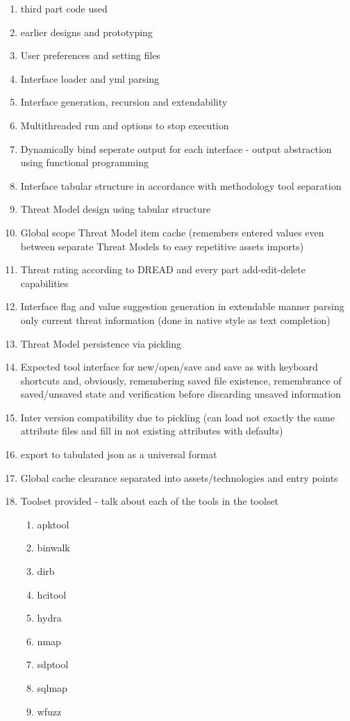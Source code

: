 \begin{enumerate}
\begin{enumerate}
		\item third part code used
		
		\item earlier designs and prototyping
		
		\item User preferences and setting files
		\item Interface loader and yml parsing
		\item Interface generation, recursion and extendability
		\item Multithreaded run and options to stop execution
		\item Dynamically bind seperate output for each interface - output abstraction using functional programming
		\item Interface tabular structure in accordance with methodology tool separation
		
		\item Threat Model design using tabular structure 
		\item Global scope Threat Model item cache (remembers entered values even between separate Threat Models to easy repetitive assets imports)
		\item Threat rating according to DREAD and every part add-edit-delete capabilities
		\item Interface flag and value suggestion generation in extendable manner parsing only current threat information (done in native style as text completion)
		
		\item Threat Model persistence via pickling
		\item Expected tool interface for new/open/save and save as with keyboard shortcuts and, obviously, remembering saved file existence, remembrance of saved/unsaved state and verification before discarding unsaved information
		\item Inter version compatibility due to pickling (can load not exactly the same attribute files and fill in not existing attributes with defaults)
		\item export to tabulated json as a universal format
		\item Global cache clearance separated into assets/technologies and entry points
		
		\item Toolset provided - talk about each of the tools in the toolset
		\begin{enumerate}
			\item apktool
			\item binwalk
			\item dirb
			\item hcitool
			\item hydra
			\item nmap
			\item sdptool
			\item sqlmap
			\item wfuzz
		\end{enumerate}
		

\end{enumerate}
\end{enumerate}
